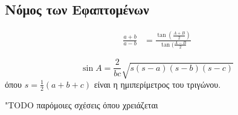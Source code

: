 \subsection{Νόμος των Εφαπτομένων}

\begin{align*} 
   \frac{a + b}{a - b} &= \frac{\tan{(\frac{A + B}{2})}}{\tan{(\frac{A - B}{2}}} 
   \end{align*}

   \[
       \sin{A} = \frac{2}{bc} \sqrt{s(s-a)(s-b)(s-c)} 
   \]
   όπου $ s= \frac{1}{2} (a+b+c) $ είναι η ημιπερίμετρος του τριγώνου.

   "TODO παρόμοιες σχέσεις όπου χρειάζεται

   
